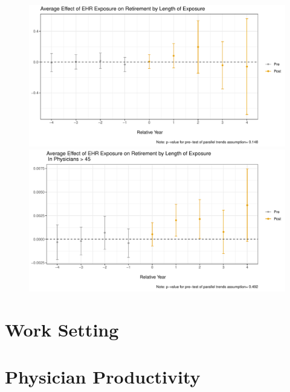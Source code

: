 \documentclass[11pt]{article}
\begin{document}
\begin{figure}[ht]
\caption{}
        \begin{minipage}[b]{0.47\linewidth}
            \centering
            \includegraphics[width=\textwidth]{Objects/ggdid_retire_allEHR.pdf}
        \end{minipage}
        \hspace{0.2cm}
        \begin{minipage}[b]{0.47\linewidth}
            \centering
            \includegraphics[width=\textwidth]{Objects/ggdid_retire_allEHR_old.pdf}
        \end{minipage}
        \label{fig:retirefirst}
\end{figure}





\section{Work Setting}

\section{Physician Productivity}
\end{document}

